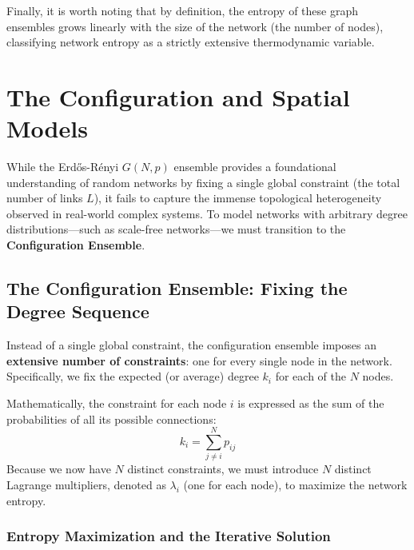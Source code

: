 Finally, it is worth noting that by definition, the entropy of these graph ensembles grows linearly with the size of the network (the number of nodes), classifying network entropy as a strictly extensive thermodynamic variable.

\section{The Configuration and Spatial Models}
\label{sec:advanced_ensembles}

While the Erdős-Rényi \(G(N,p)\) ensemble provides a foundational understanding of random networks by fixing a single global constraint (the total number of links \(L\)), it fails to capture the immense topological heterogeneity observed in real-world complex systems. To model networks with arbitrary degree distributions—such as scale-free networks—we must transition to the \textbf{Configuration Ensemble}.

\subsection{The Configuration Ensemble: Fixing the Degree Sequence}
\label{subsec:configuration_ensemble}

Instead of a single global constraint, the configuration ensemble imposes an \textbf{extensive number of constraints}: one for every single node in the network. Specifically, we fix the expected (or average) degree \(k_i\) for each of the \(N\) nodes.


Mathematically, the constraint for each node \(i\) is expressed as the sum of the probabilities of all its possible connections:
\[
    k_i = \sum_{j \neq i}^N p_{ij}
\]
Because we now have \(N\) distinct constraints, we must introduce \(N\) distinct Lagrange multipliers, denoted as \(\lambda_i\) (one for each node), to maximize the network entropy.

\subsubsection{Entropy Maximization and the Iterative Solution}
\label{subsubsec:iterative_solution}

